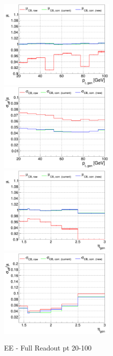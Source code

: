 \begin{figure}
\includegraphics[width=0.495\textwidth]{./ECAL_plots/plotsNoPU/EE/pdf/FULL/GENPT/EEFULL_GENPT_0020_0100_MuOverBins.pdf}
\includegraphics[width=0.495\textwidth]{./ECAL_plots/plotsNoPU/EE/pdf/FULL/GENPT/EEFULL_GENPT_0020_0100_EffSigmaOverBins.pdf}
\includegraphics[width=0.495\textwidth]{./ECAL_plots/plotsNoPU/EE/pdf/FULL/GENETA/EEFULL_GENETA_0020_0100_MuOverBins.pdf}
\includegraphics[width=0.495\textwidth]{./ECAL_plots/plotsNoPU/EE/pdf/FULL/GENETA/EEFULL_GENETA_0005_0020_EffSigmaOverBins.pdf}
\caption{EE - Full Readout pt 20-100}
\end{figure}


